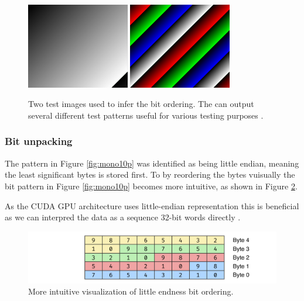 \begin{figure}[H]
    \centering
    \includegraphics[width=0.4\textwidth]{figures/unpacking/test_pattern0.jpg}
    \includegraphics[width=0.4\textwidth]{figures/unpacking/test_pattern2.jpg}
    \caption{Two test images used to infer the bit ordering.
        The \cam can output several different test patterns useful for various testing purposes \cite{lucidvisionlabsTritonMPPolarized2020}.}
    \label{fig:test_pattern}
\end{figure}


\subsubsection{Bit unpacking} \label{sec:contuguous_access}
The pattern in Figure \ref{fig:mono10p} was identified as being little endian, meaning the least significant bytes is stored first.
To by reordering the bytes vuisually the bit pattern in Figure \ref{fig:mono10p} becomes more intuitive, as shown in Figure \ref{fig:mono10p_reordered}.

As the CUDA GPU architecture uses little-endian representation this is beneficial as we can interpred the data as a sequence 32-bit words directly \cite[127]{CUDAProgrammingGuide}.

\begin{figure}[H]
    \centering
    \includegraphics[width=\textwidth]{figures/unpacking/layout_10p_be.pdf}
    \caption{More intuitive visualization of little endness bit ordering.}
    \label{fig:mono10p_reordered}
\end{figure}
